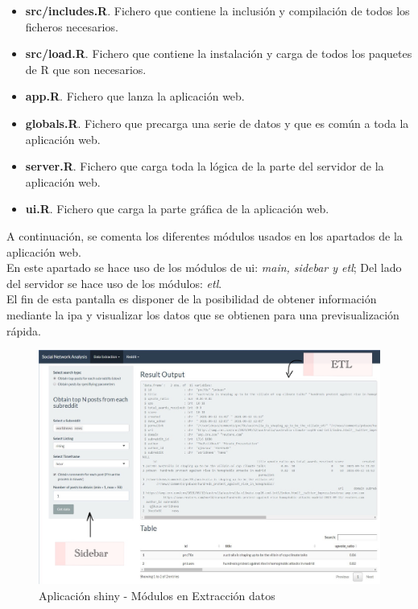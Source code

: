 \documentclass[../../main.tex]{subfiles}
\begin{document}
\begin{itemize}
    \item \textbf{src/includes.R}. Fichero que contiene la inclusión y compilación de todos los ficheros necesarios.
    \item \textbf{src/load.R}. Fichero que contiene la instalación y carga de todos los paquetes de R que son necesarios.
    \item \textbf{app.R}. Fichero que lanza la aplicación web.
    \item \textbf{globals.R}. Fichero que precarga una serie de datos y que es común a toda la aplicación web.
    \item \textbf{server.R}. Fichero que carga toda la lógica de la parte del servidor de la aplicación web.
    \item \textbf{ui.R}. Fichero que carga la parte gráfica de la aplicación web.
\end{itemize}

A continuación, se comenta los diferentes módulos usados en los apartados de la aplicación web.  \\

En este apartado se hace uso de los módulos de \gls{ui}: \textit{main, sidebar y etl}; Del lado del servidor se hace uso de los módulos: \textit{etl}.  \\
El fin de esta pantalla es disponer de la posibilidad de obtener información mediante la \gls{ipa} y visualizar los datos que se obtienen para una previsualización rápida.

\begin{figure}[H]
\centering
\includegraphics[width=400pt]{images/implementacion/app-1.jpg}
\caption{Aplicación \Gls{shiny} - Módulos en Extracción datos}
\end{figure}
\end{document}
